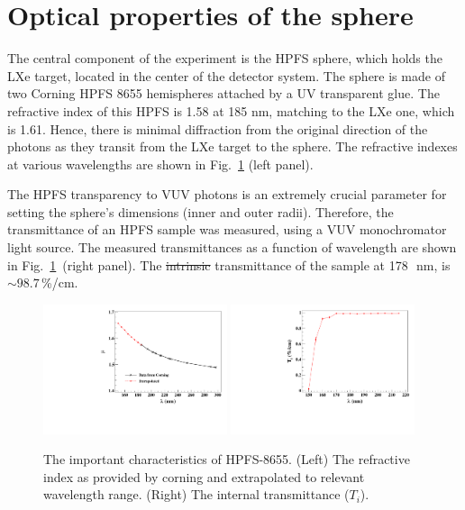 \section{Optical properties of the sphere }
\label{sec:opt}

The central component of the experiment is the HPFS sphere, which holds the LXe target, located in the center of the detector system. The sphere is made of two Corning HPFS 8655 hemispheres attached by a UV transparent glue. The refractive index of this HPFS is 1.58 at 185 nm, matching to the LXe one, which is 1.61. Hence, there is minimal diffraction from the original direction of the photons as they transit from the LXe target to the sphere. The refractive indexes at various wavelengths are shown in Fig.~\ref{fig:hpfsRIcalibration} (left panel).


The HPFS transparency to VUV photons is an extremely crucial parameter for setting the sphere's dimensions (inner and outer radii). Therefore, the transmittance of an HPFS sample was measured, using a VUV monochromator light source. 
The measured transmittances as a function of wavelength are shown in Fig.~\ref{fig:hpfsRIcalibration}~(right panel). The \sout{intrinsic} transmittance of the sample at 178~\,nm, is$\sim98.7$\,\%/cm.  

\begin{figure}[h]
   \centering
   \includegraphics[width=0.48\textwidth]{RI-calibration.pdf}
    \includegraphics[width=0.48\textwidth]{IntTransmittance.pdf}
   \caption{The important characteristics of HPFS-8655. (Left) The refractive index as provided by corning and 
   extrapolated to relevant wavelength range. (Right) The internal transmittance ($T_{i}$).} 
   \label{fig:hpfsRIcalibration}
\end{figure}


